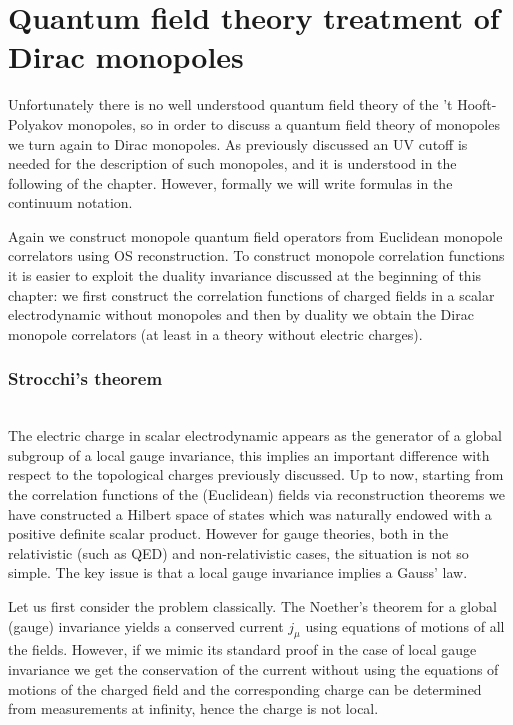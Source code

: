 \documentclass[../main/main.tex]{subfiles}
\begin{document}

\section{Quantum field theory treatment of Dirac monopoles}

Unfortunately there is no well understood quantum field theory of the 't Hooft-Polyakov monopoles, so in order to discuss a quantum field theory of monopoles we turn again to Dirac monopoles. As previously discussed an UV cutoff is needed for the description of such monopoles, and it is understood in the following of the chapter. However, formally we will write formulas in the continuum notation. 

Again we construct monopole quantum field operators from Euclidean monopole correlators using OS reconstruction. To construct monopole correlation functions it is easier to exploit the duality invariance discussed at the beginning of this chapter: we first construct the correlation functions of charged fields in a scalar electrodynamic without monopoles and then by duality we obtain the Dirac monopole correlators (at least in a theory without electric charges). 

\subsubsection{Strocchi's theorem}

\cite[Chapter 7]{Strocchi_2013}\\

The electric charge in scalar electrodynamic appears as the generator of a global subgroup of a local gauge invariance, this implies an important difference with respect to the topological charges previously discussed. 
Up to now, starting from the correlation functions of the (Euclidean) fields via reconstruction theorems we have constructed a Hilbert space of states which was naturally endowed with a positive definite scalar product. 
However for gauge theories, both in the relativistic (such as QED) and non-relativistic cases, the situation is not so simple. The key issue is that a local gauge invariance implies a Gauss' law. 

Let us first consider the problem classically. The Noether's theorem for a global (gauge) invariance yields a conserved current $j_\mu$ using equations of motions of all the fields. However, if we mimic its standard proof in the case of local gauge invariance we get the conservation of the current without using the equations of motions of the charged field and the corresponding charge can be determined from measurements at infinity, hence the charge is not local. 
\end{document}
